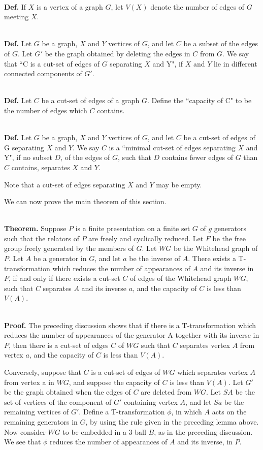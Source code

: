 \documentclass[12pt]{amsart}
\newcommand{\definition}{\ \\ \noindent \textbf{Def.} }
\newcommand{\theorem}{\ \\ \noindent  \textbf{Theorem.} }
\newcommand{\pf}{\ \\ \noindent \textbf{Proof.} }
\begin{document}
\definition     If $X$ is a vertex of a graph $G$, let $V(X)$ denote the number of edges of $G$ meeting $X$.
        
\definition Let $G$ be a graph, $X$ and $Y$ vertices of $G$, and let
$C$ be a subset of the edges of $G$.  Let $G'$ be the graph obtained
by deleting the edges in $C$ from $G$. We say that ``C is a cut-set of
edges of $G$ separating $X$ and Y", if $X$ and $Y$ lie in different
connected components of $G'$.

\definition     Let $C$ be a cut-set of edges of a graph $G$. Define the  ``capacity of C" to be the number
        of edges which $C$ contains.
                
\definition     Let $G$ be a graph, $X$ and $Y$ vertices of $G$, and let $C$ be a cut-set of edges of G
        separating $X$ and $Y$. We say $C$ is a  ``minimal cut-set of edges separating $X$ and Y", if
        no subset $D$, of the edges of $G$, such that $D$ contains fewer edges of $G$ than $C$ contains,
        separates $X$ and $Y$.

                Note that a cut-set of edges separating $X$ and $Y$ may be empty.
        
                We can now prove the main theorem of this section.
        
\theorem  Suppose $P$ is a finite presentation on a finite set $G$ of $g$ generators such that the
        relators of $P$ are freely and cyclically reduced. Let $F$ be the free group freely generated
        by the members of $G$. Let $WG$ be the Whitehead graph of $P$. Let $A$ be a generator in $G$, and
        let $a$ be the inverse of $A$. There exists a T-transformation which reduces the number of
        appearances of $A$ and its inverse in $P$, if and only if there exists a cut-set $C$ of edges
        of the Whitehead graph $WG$, such that $C$ separates $A$ and its inverse $a$, and the capacity
        of $C$ is less than $V(A)$.

\pf  The preceding discussion shows that if there is a T-transformation which reduces
        the number of appearances of the generator A together with its inverse in $P$, then there
        is a cut-set of edges $C$ of $WG$ such that $C$ separates vertex $A$ from vertex $a$, and the
        capacity of $C$ is less than $V(A)$.
             
        Conversely, suppose that $C$ is a cut-set of edges of $WG$ which separates vertex $A$ from
        vertex a in $WG$, and suppose the capacity of $C$ is less than $V(A)$. Let $G'$ be the graph
        obtained when the edges of $C$ are deleted from $WG$. Let $SA$ be the set of vertices of the
        component of $G'$ containing vertex $A$, and let $Sa$ be the remaining vertices of $G'$. Define
        a T-transformation $\phi$, in which $A$ acts on the remaining generators in $G$, by using the rule
        given in the preceding lemma above. Now consider $WG$ to be embedded in a 3-ball $B$, as
        in the preceding discussion. We see that $\phi$ reduces the number of appearances of $A$ and
        its inverse, in $P$.
                
\end{document}
